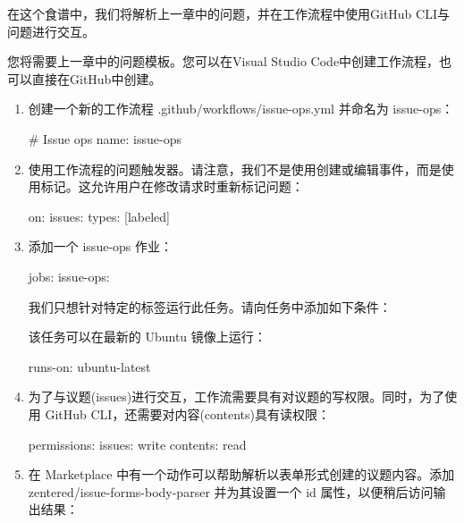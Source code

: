 
在这个食谱中，我们将解析上一章中的问题，并在工作流程中使用GitHub CLI与问题进行交互。


您将需要上一章中的问题模板。您可以在Visual Studio Code中创建工作流程，也可以直接在GitHub中创建。


\begin{enumerate}
\item 
创建一个新的工作流程 .github/workflows/issue-ops.yml 并命名为 issue-ops：

\begin{shell}
# Issue ops
name: issue-ops
\end{shell}

\item 
使用工作流程的问题触发器。请注意，我们不是使用创建或编辑事件，而是使用标记。这允许用户在修改请求时重新标记问题：

\begin{shell}
on:
  issues:
    types: [labeled]
\end{shell}

\item 
添加一个 issue-ops 作业：

\begin{shell}
jobs:
  issue-ops:
\end{shell}

我们只想针对特定的标签运行此任务。请向任务中添加如下条件：


该任务可以在最新的 Ubuntu 镜像上运行：

\begin{shell}
runs-on: ubuntu-latest
\end{shell}

\item 
为了与议题(issues)进行交互，工作流需要具有对议题的写权限。同时，为了使用 GitHub CLI，还需要对内容(contents)具有读权限：

\begin{shell}
permissions:
  issues: write
  contents: read
\end{shell}

\item 
在 Marketplace 中有一个动作可以帮助解析以表单形式创建的议题内容。添加 zentered/issue-forms-body-parser 并为其设置一个 id 属性，以便稍后访问输出结果：


\end{enumerate}
